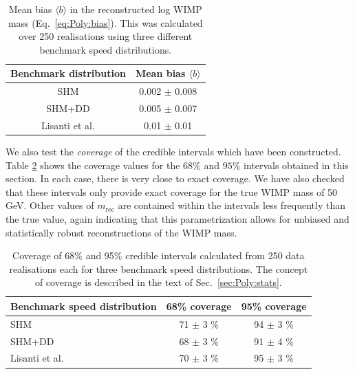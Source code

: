 \begin{table}[t]
  \setlength{\extrarowheight}{3pt}
  \setlength{\tabcolsep}{3pt}
  \begin{center}
	\begin{tabular}{c|c}
        \hline\hline
	Benchmark distribution & Mean bias $\langle b \rangle$ \\
	\hline
	SHM & 0.002 $\pm$ 0.008 \\
	SHM+DD & 0.005 $\pm$ 0.007 \\
	Lisanti et al. & 0.01 $\pm$ 0.01 \\
        \hline\hline
	\end{tabular}
  \end{center}
\caption[Mean bias in the reconstructed log WIMP mass using the \PLF method]{Mean bias $\langle b \rangle$ in the reconstructed log WIMP mass (Eq.~\ref{eq:Poly:bias}). This was calculated over 250 realisations using three different benchmark speed distributions.}
\label{tab:Poly:bias}
\end{table}

We also test the \textit{coverage} of the credible intervals which have been constructed. Table \ref{tab:Poly:coverage} shows the coverage values for the $68\%$ and $95\%$ intervals obtained in this section. In each case, there is very close to exact coverage. We have also checked that these intervals only provide exact coverage for the true WIMP mass of 50 GeV. Other values of $m_\textrm{rec}$ are contained within the intervals less frequently than the true value, again indicating that this parametrization allows for unbiased and statistically robust reconstructions of the WIMP mass.

\begin{table}[t]
  \setlength{\extrarowheight}{3pt}
  \setlength{\tabcolsep}{3pt}
  \begin{center}
	\begin{tabular}{m{1in}|cc}
        \hline\hline
	Benchmark speed distribution & 68\% coverage & 95\% coverage\\
	\hline
	SHM &  71 $\pm$ 3 \% & 94 $\pm$ 3 \%  \\
	SHM+DD & 68 $\pm$ 3 \% & 91 $\pm$ 4 \%  \\
	Lisanti et al. & 70 $\pm$ 3 \% & 95 $\pm$ 3 \%  \\
        \hline \hline
	\end{tabular}
  \end{center}
\caption[Credible interval coverage results for the \PLF method]{Coverage of 68\% and 95\% credible intervals calculated from 250 data realisations each for three benchmark speed distributions. The concept of coverage is described in the text of Sec.~\ref{sec:Poly:stats}.}
\label{tab:Poly:coverage}
\end{table}

